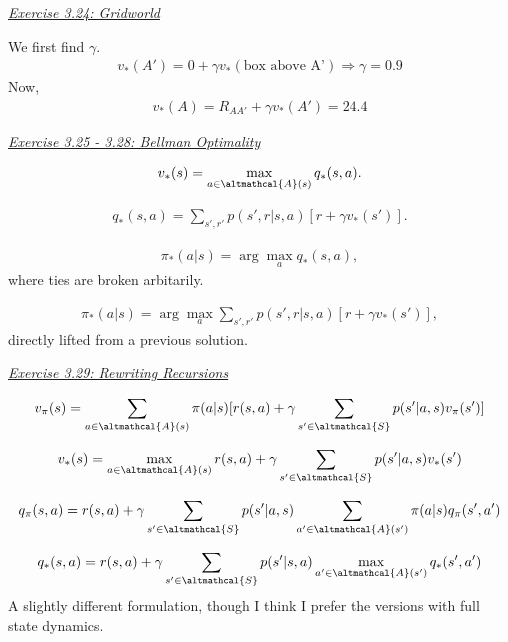 \documentclass{article}
\newcommand{\myq}[1]{%
	\vspace{1em}
	\noindent\underline{\emph{Exercise #1}}\vspace{0.25em}\linebreak
}
\begin{document}
\myq{3.24: Gridworld}
We first find $\gamma$. 
\begin{align}
v_*(A') = 0 + \gamma v_*(\text{box above A'}) \Rightarrow \gamma = 0.9
\end{align}
Now,
\begin{align}
v_*(A) = R_{AA'} + \gamma v_*(A') = 24.4
\end{align}

\myq{3.25 - 3.28: Bellman Optimality}
\begin{align}
v_*(s) = \max_{a\in \altmathcal{A}(s)} q_*(s, a).
\end{align}

\begin{align}
q_*(s, a) = \sum_{s', r'} p(s', r | s, a) [r + \gamma v_*(s')].
\end{align}

\begin{align}
\pi_*(a | s) = \arg \max_a q_*(s, a),
\end{align}
where ties are broken arbitarily. 

\begin{align}
\pi_*(a | s) = \arg \max_a  \sum_{s', r'} p(s', r | s, a) [r + \gamma v_*(s')],
\end{align}
directly lifted from a previous solution. 

\myq{3.29: Rewriting Recursions}
\begin{align}
v_\pi(s) = \sum_{a\in \altmathcal{A}(s)} \pi(a|s) [r(s, a) + \gamma \sum_{s' \in \altmathcal{S}} p(s' | a, s) v_\pi(s')]
\end{align}

\begin{align}
v_*(s) = \max_{a\in \altmathcal{A}(s)} r(s, a) + \gamma \sum_{s' \in \altmathcal{S}} p(s' | a, s) v_*(s')
\end{align}

\begin{align}
q_\pi(s, a) = r(s, a) + \gamma \sum_{s' \in \altmathcal{S}} p(s' | a, s) \sum_{a' \in \altmathcal{A}(s')} \pi(a | s) q_\pi(s', a')
\end{align}

\begin{align}
q_*(s, a) = r(s, a) + \gamma \sum_{s' \in \altmathcal{S}} p(s' | s, a) \max_{a'\in \altmathcal{A}(s')} q_*(s', a')
\end{align}
A slightly different formulation, though I think I prefer the versions with full state dynamics. 
\end{document}
